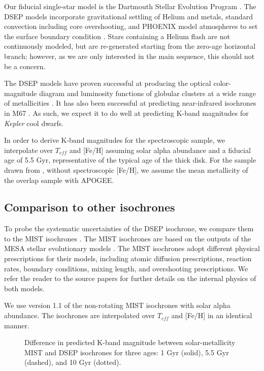 \documentclass[manuscript]{aastex6}
\newcommand{\Kepler}{\mbox{\textit{Kepler}}}
\newcommand{\Teff}{\ensuremath{T_{eff}}}
\newcommand{\gvs}{\authorcomment1}
\begin{document}
\gvs{Under construction}

Our fiducial single-star model is the Dartmouth Stellar Evolution Program
\citep[DSEP]{Dotter08}. The DSEP models incorporate gravitational settling of
Helium and metals, standard convection including core overshooting, and PHOENIX
model atmospheres to set the surface boundary condition \citep{Hauschildt99a,
Hauschildt99b}. Stars containing a Helium flash are not continuously modeled,
but are re-generated starting from the zero-age horizontal branch; however, as
we are only interested in the main sequence, this should not be a
concern\citep{Dotter08}.

The DSEP models have proven successful at producing the optical color-magnitude
diagram and luminosity functions of globular clusters at a wide range of
metallicities \citep{Dotter07}. It has also been successful at predicting
near-infrared isochrones in M67 \citep{Sarajedini09}. As such, we expect it to
do well at predicting K-band magnitudes for \Kepler{} cool dwarfs.

In order to derive K-band magnitudes for the spectroscopic sample, we 
interpolate over \Teff{} and [Fe/H]
assuming solar alpha abundance and a fiducial age of 5.5 Gyr, representative
of the typical age of the thick disk. For the sample drawn from
\citet{McQuillan14}, without spectroscopic [Fe/H], we assume the mean
metallicity of the overlap sample with APOGEE\@.


\subsection{Comparison to other isochrones}

To probe the systematic uncertainties of the DSEP isochrone, we compare them to
the MIST isochrones \citep{Dotter16, Choi16}. The MIST isochrones are based on 
the outputs of the MESA stellar evolutionary models \citep{Paxton11, Paxton13, 
Paxton15}. The MIST isochrones adopt different physical prescriptions for their
models, including atomic diffusion prescriptions, reaction rates, boundary
conditions, mixing length, and overshooting prescriptions. We refer the reader
to the source papers for further details on the internal physics of both
models.

We use version 1.1 of the non-rotating MIST isochrones with solar alpha
abundance. The isochrones are interpolated over \Teff{} and [Fe/H] in an
identical manner. 

\begin{figure}[htb]
    \centering
    \caption{Difference in predicted K-band magnitude between solar-metallicity 
    MIST and DSEP isochrones for three ages: 1 Gyr (solid), 5.5 Gyr (dashed), 
and 10 Gyr (dotted).}\label{fig:mist_dsep_age}
\end{figure}
\end{document}
